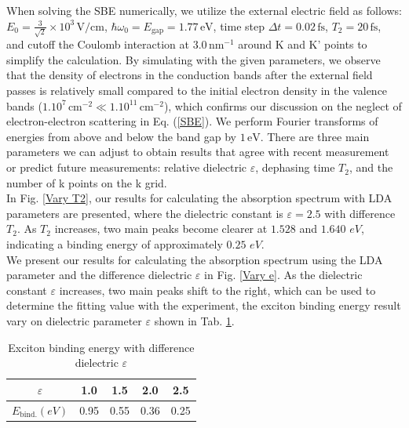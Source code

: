 \documentclass[12pt,english,a4paper]{article}
\begin{document}
\quad When solving the SBE numerically, we utilize the external electric field as follows: \(E_0 = \frac{3}{\sqrt{2}} \times 10^3 \, \text{V/cm}\), \(\hbar \omega_0 = E_{\text{gap}} = 1.77 \, \text{eV}\), time step \(\Delta t = 0.02 \, \text{fs}\), $ T_2= 20\, \text{fs}$, and cutoff the Coulomb interaction at \(3.0 \, \text{nm}^{-1}\) around K and K' points to simplify the calculation. By simulating with the given parameters, we observe that the density of electrons in the conduction bands after the external field passes is relatively small compared to the initial electron density in the valence bands (\(1.10^{7} \, \text{cm}^{-2} \ll 1.10^{11} \, \text{cm}^{-2}\)), which confirms our discussion on the neglect of electron-electron scattering in Eq. (\ref{SBE}). We perform Fourier transforms of energies from above and below the band gap by \(1 \, \text{eV}\). There are three main parameters we can adjust to obtain results that agree with recent measurement or predict future measurements: relative dielectric \(\varepsilon\), dephasing time \(T_2\), and the number of k points on the k grid.\\\null
\quad In Fig. \ref{Vary T2}, our results for calculating the absorption spectrum with LDA parameters are presented, where the dielectric constant is $\varepsilon = 2.5$ with difference $T_2$. As $T_2$ increases, two main peaks become clearer at $1.528$ and $1.640$ \(eV\), indicating a binding energy of approximately $0.25$ \(eV\).\\ \null 
\quad We present our results for calculating the absorption spectrum using the LDA parameter and the difference dielectric $\varepsilon$ in Fig. \ref{Vary e}. As the dielectric constant $\varepsilon$ increases, two main peaks shift to the right, which can be used to determine the fitting value with the experiment, the exciton binding energy result vary on dielectric parameter $\varepsilon$ shown in Tab. \ref{Binding table}.\\\null
\begin{table}[h]
	\begin{center}
		\begin{tabular}{| c | c | c | c | c|}
			\hline
			$\varepsilon$ & 1.0 & 1.5 & 2.0 & 2.5\\\hline
			$E_{\mathrm{bind.}} (eV)$ & 0.95 & 0.55 & 0.36 & 0.25\\\hline
		\end{tabular}
		\caption[Exciton binding energy with difference dielectric]{Exciton binding energy with difference dielectric $\varepsilon$}
		\label{Binding table}
	\end{center}
\end{table}
\end{document}
